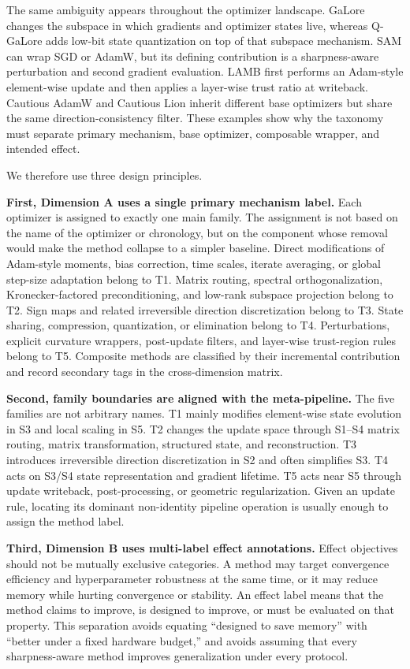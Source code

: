 The same ambiguity appears throughout the optimizer landscape.  GaLore
changes the subspace in which gradients and optimizer states live, whereas
Q-GaLore adds low-bit state quantization on top of that subspace mechanism.
SAM can wrap SGD or AdamW, but its defining contribution is a
sharpness-aware perturbation and second gradient evaluation.  LAMB first
performs an Adam-style element-wise update and then applies a layer-wise trust
ratio at writeback.  Cautious AdamW and Cautious Lion inherit different base
optimizers but share the same direction-consistency filter.  These examples
show why the taxonomy must separate primary mechanism, base optimizer,
composable wrapper, and intended effect.

We therefore use three design principles.

\textbf{First, Dimension A uses a single primary mechanism label.}
Each optimizer is assigned to exactly one main family. The assignment is not based on the name of the optimizer or chronology, but on the component whose removal would make the method collapse to a simpler baseline. Direct modifications of Adam-style moments, bias correction, time scales, iterate
averaging, or global step-size adaptation belong to T1.  Matrix routing,
spectral orthogonalization, Kronecker-factored preconditioning, and low-rank
subspace projection belong to T2.  Sign maps and related irreversible
direction discretization belong to T3.  State sharing, compression,
quantization, or elimination belong to T4.  Perturbations, explicit curvature
wrappers, post-update filters, and layer-wise trust-region rules belong to T5.
Composite methods are classified by their incremental contribution and record
secondary tags in the cross-dimension matrix.

\textbf{Second, family boundaries are aligned with the meta-pipeline.}
The five families are not arbitrary names.  T1 mainly modifies element-wise
state evolution in S3 and local scaling in S5.  T2 changes the update space
through S1--S4 matrix routing, matrix transformation, structured state, and
reconstruction.  T3 introduces irreversible direction discretization in S2
and often simplifies S3.  T4 acts on S3/S4 state representation and gradient
lifetime.  T5 acts near S5 through update writeback, post-processing, or
geometric regularization.  Given an update rule, locating its dominant
non-identity pipeline operation is usually enough to assign the method label.

\textbf{Third, Dimension B uses multi-label effect annotations.}
Effect objectives should not be mutually exclusive categories.  A method may
target convergence efficiency and hyperparameter robustness at the same time,
or it may reduce memory while hurting convergence or stability.  An effect
label means that the method claims to improve, is designed to improve, or must
be evaluated on that property.
This separation avoids equating ``designed to save memory'' with ``better
under a fixed hardware budget,'' and avoids assuming that every
sharpness-aware method improves generalization under every protocol.

